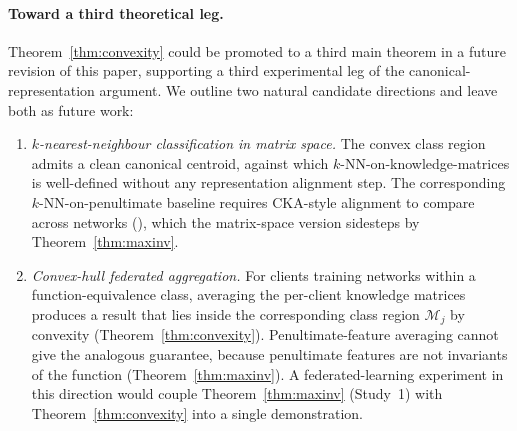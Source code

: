 \paragraph{Toward a third theoretical leg.}
Theorem~\ref{thm:convexity} could be promoted to a third main theorem
in a future revision of this paper, supporting a third experimental
leg of the canonical-representation argument. We outline two natural
candidate directions and leave both as future work:

\begin{enumerate}
\item \emph{$k$-nearest-neighbour classification in matrix space.}
The convex class region admits a clean canonical centroid, against
which $k$-NN-on-knowledge-matrices is well-defined without any
representation alignment step. The corresponding $k$-NN-on-penultimate
baseline requires CKA-style alignment to compare across networks
(\citealt{kornblith2019similarity}), which the matrix-space version
sidesteps by Theorem~\ref{thm:maxinv}.

\item \emph{Convex-hull federated aggregation.}
For clients training networks within a function-equivalence class,
averaging the per-client knowledge matrices produces a result that
lies inside the corresponding class region $\mathcal{M}_j$ by
convexity (Theorem~\ref{thm:convexity}). Penultimate-feature
averaging cannot give the analogous guarantee, because penultimate
features are not invariants of the function
(Theorem~\ref{thm:maxinv}). A federated-learning experiment in
this direction would couple Theorem~\ref{thm:maxinv} (Study~1)
with Theorem~\ref{thm:convexity} into a single demonstration.
\end{enumerate}
